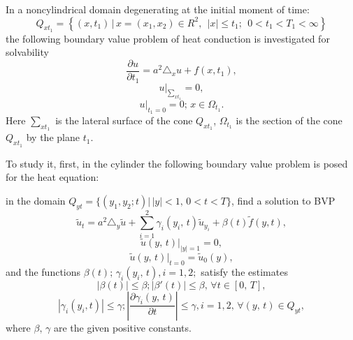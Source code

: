 
\vzmscaption

In a noncylindrical domain degenerating at the initial moment of time:
$$
Q_{xt_{1}}\!=\!\left\{(x,t_{1})\,\Big|\, x=(x_{1}, x_{2})\in R^{2},\; \,|x|\leq t_{1}; \; \,
0< t_{1}<T_{1}<\infty \right\}
$$
the following boundary value problem of heat conduction is investigated for solvability
\begin{equation}\label{32-1}
\frac{\partial u}{\partial t_1}=a^{2}\triangle_x u+f(x,t_{1}),
\end{equation}
\begin{equation}\label{33-1}
u|_{\sum_{xt_{1}}}=0,
\end{equation}
\begin{equation}\label{34-1}
u|_{t_{1}=0}=0;\, x\in\Omega_{t_{1}}.
\end{equation}
Here $\sum_{xt_{1}}$ is the lateral surface of the cone $Q_{xt_{1}}$,
$\Omega_{t_{1}}$ is the section of the cone $Q_{xt_{1}}$ by the plane $t_{1}$.

To study it, first, in the cylinder the following boundary value problem is posed for the heat equation:

in the domain $Q_{yt}=\{(y_{1}, y_{2}; t) | \, |y|<1, \, 0<t<T \}$, find a solution to BVP
\begin{equation}\label{7}
\tilde{u}_{t}=a^{2}\triangle_{y}\tilde{u}+\sum_{i=1}^{2}\gamma_{i}(y_{i},\,t)\tilde{u}_{y_{i}}+\beta(t)\tilde{f}(y,t),
\end{equation}
\begin{equation}\label{5}
\tilde{u}(y,\,t)|_{|y|=1}=0,
\end{equation}
\begin{equation}\label{6}
\tilde{u}(y,\,t)|_{t=0}=\tilde{u}_{0}(y),
\end{equation}
and the functions $\beta(t);\,\gamma_{i}(y_{i},\,t),i=1,2;$
satisfy the estimates
\begin{equation}\label{6-1}
|\beta(t)|\leq \beta; |\beta'(t)|\leq\beta, \, {\forall t\in[0,\,T]},
\end{equation}
\begin{equation}\label{6-2}
|\gamma_{i}(y_{i}, t)|\leq\gamma; \left|\frac{\partial \gamma_{i}(y,\,t)}{\partial t}\right|\leq\gamma, i=1,2,\, \forall(y,\,t)\in Q_{yt},
\end{equation}
where $\beta,\, \gamma$ are the given positive constants.

